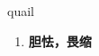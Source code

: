 
\begin{frame}
{\huge quail}
\begin{center}
\begin{enumerate}\Large
  \item \textbf{胆怯，畏缩}
\end{enumerate}
\end{center}
\end{frame}
